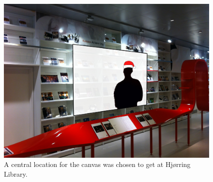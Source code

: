 


\begin{figure}[htbp]
\centering
\includegraphics[width=1.00\textwidth]{Pictures/HjoerringLibrary/LocationJohannesHat.jpg}
\caption{A central location for the canvas was chosen to get at Hj{\o}rring Library.}
\label{fig:concept_art}
\end{figure}


